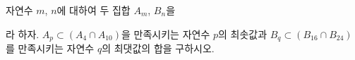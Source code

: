 자연수 $m$, $n$에 대하여 두 집합 $A_m$, $B_n$을\par\smallskip{}\par\smallskip\noindent 라 하자. $A_p\subset(A_4\cap A_{10})$을 만족시키는 자연수 $p$의 최솟값과 $B_q\subset(B_{16}\cap B_{24})$를 만족시키는 자연수 $q$의 최댓값의 합을 구하시오.

